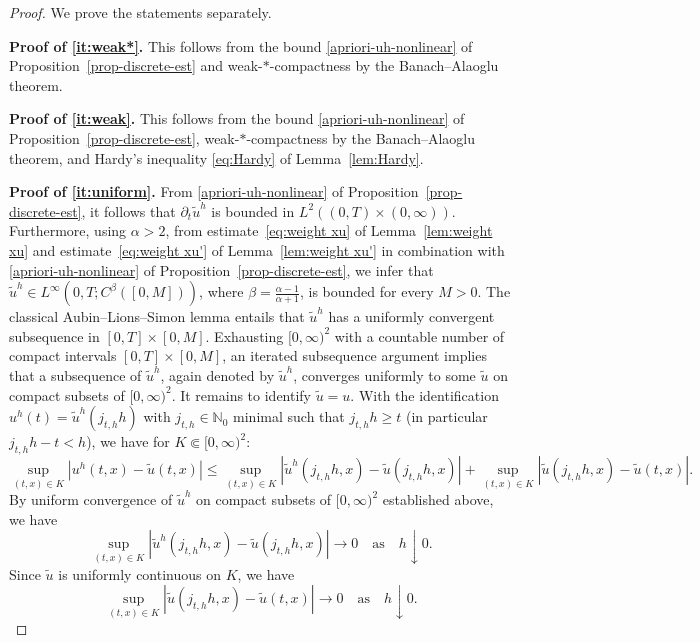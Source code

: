 \documentclass[reqno,12pt]{amsart}
\newcommand{\N}{\ensuremath{\mathbb{N}}}
\numberwithin{equation}{section}
\begin{document}
%
\begin{proof} We prove the statements separately.

%
\bigskip
%

%
\textbf{Proof of \eqref{it:weak*}. }
%
This follows from the bound \eqref{apriori-uh-nonlinear} of Proposition~\ref{prop-discrete-est} and weak-$*$-compactness by the Banach--Alaoglu theorem.

%
\bigskip
%

%
\textbf{Proof of \eqref{it:weak}. }
%
This follows from the bound \eqref{apriori-uh-nonlinear} of Proposition~\ref{prop-discrete-est}, weak-$*$-compactness by the Banach--Alaoglu theorem, and Hardy's inequality \eqref{eq:Hardy} of Lemma~\ref{lem:Hardy}.

%
\bigskip
%

%
\textbf{Proof of \eqref{it:uniform}. }
%
From \eqref{apriori-uh-nonlinear} of Proposition~\ref{prop-discrete-est}, it follows that $\partial_t \tilde u^h$ is bounded in $L^2((0,T)\times(0,\infty))$. Furthermore, using $\alpha > 2$, from estimate~\eqref{eq:weight xu} of Lemma~\ref{lem:weight xu} and estimate~\eqref{eq:weight xu'} of Lemma~\ref{lem:weight xu'} in combination with \eqref{apriori-uh-nonlinear} of Proposition~\ref{prop-discrete-est}, we infer that $\tilde u^h \in L^\infty(0,T;C^\beta([0,M]))$, where $\beta = \frac{\alpha-1}{\alpha+1}$, is bounded for every $M > 0$. The classical Aubin--Lions--Simon lemma \cite[Corollary~4]{simon1986compact} entails that $\tilde u^h$ has a uniformly convergent subsequence in $[0,T] \times [0,M]$. Exhausting $[0,\infty)^2$ with a countable number of compact intervals $[0,T] \times [0,M]$, an iterated subsequence argument implies that a subsequence of $\tilde u^h$, again denoted by $\tilde u^h$, converges uniformly to some $\tilde u$ on compact subsets of $[0,\infty)^2$. 
It remains to identify $\tilde{u} = u$. With the identification $u^h(t) = \tilde u^h(j_{t,h}h)$ with $j_{t,h} \in \N_0$ minimal such that $j_{t,h} h \ge t$ (in particular $j_{t,h}h-t < h$), we have for $K \Subset [0,\infty)^2$:
%
\[
\sup_{(t,x) \in K} |u^h(t,x) - \tilde u(t,x)| \le \sup_{(t,x) \in K} |\tilde u^h(j_{t,h} h,x) - \tilde u(j_{t,h} h,x)| + \sup_{(t,x) \in K} |\tilde u(j_{t,h} h,x) - \tilde u(t,x)|.
\]
%
By uniform convergence of $\tilde u^h$ on compact subsets of $[0,\infty)^2$ established above, we have
%
\[
\sup_{(t,x) \in K} |\tilde u^h(j_{t,h} h,x) - \tilde u(j_{t,h} h,x)| \to 0 \quad \text{as} \quad h \downarrow 0.
\]
%
Since $\tilde u$ is uniformly continuous on $K$, we have
%
\[
\sup_{(t,x) \in K} |\tilde u(j_{t,h} h,x) - \tilde u(t,x)| \to 0 \quad \text{as} \quad h \downarrow 0.
\]
\end{proof}
\end{document}
